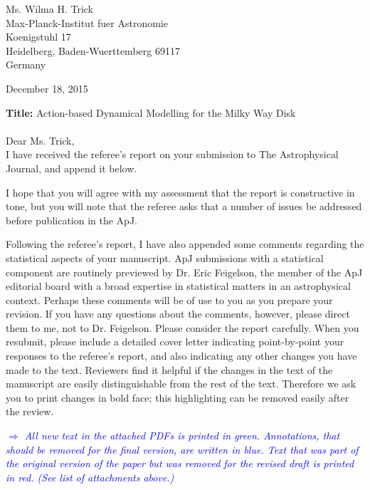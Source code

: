 \documentclass[10pt,a4paper]{article}
\newcommand{\Comment}[1]{\textsl{\textcolor{Blue}{$\Longrightarrow$ {#1}}}}
\begin{document}
\newpage



\noindent Ms. Wilma H. Trick\\
Max-Planck-Institut fuer Astronomie\\
Koenigstuhl 17\\
Heidelberg, Baden-Wuerttemberg 69117\\
Germany

\begin{flushright}
December 18, 2015
\end{flushright}

\textbf{Title:} Action-based Dynamical Modelling for the Milky Way Disk\\\\

Dear Ms. Trick,\\

I have received the referee's report on your submission to The Astrophysical
Journal, and append it below.

I hope that you will agree with my assessment that the report is constructive in
tone, but you will note that the referee asks that a number of issues be addressed
before publication in the ApJ.
  
Following the referee's report, I have also appended some comments regarding the
statistical aspects of your manuscript. ApJ submissions with a statistical component
are routinely previewed by Dr. Eric Feigelson, the member of the ApJ editorial board
with a broad expertise in statistical matters in an astrophysical context. Perhaps
these comments will be of use to you as you prepare your revision. If you have any
questions about the comments, however, please direct them to me, not to Dr.
Feigelson.
Please consider the report carefully. When you resubmit, please include a detailed cover letter indicating point-by-point your responses to the referee's report, and also indicating any other changes you have made to the text. Reviewers find it helpful if the changes in the text of the manuscript are easily distinguishable from the rest of the text. Therefore we ask you to print changes in bold face; this highlighting can be removed easily after the review. 

\Comment{All new text in the attached PDFs is printed in green. Annotations, that should be removed for the final version, are written in blue. Text that was part of the original version of the paper but was removed for the revised draft is printed in red. (See list of attachments above.)}\\
\end{document}
